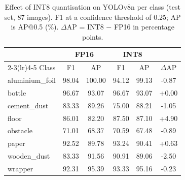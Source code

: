 \begin{table}[t]
\centering
\caption{Effect of INT8 quantisation on YOLOv8n per class (test set, 87 images). F1 at a confidence threshold of 0.25; AP is AP@0.5 (\%). $\Delta$AP = INT8 $-$ FP16 in percentage points.}
\label{tab:per_class_int8}
\footnotesize\setlength{\tabcolsep}{3pt}
\begin{tabular}{lccccc}
\toprule
 & \multicolumn{2}{c}{FP16} & \multicolumn{2}{c}{INT8} & \\
\cmidrule(lr){2-3}\cmidrule(lr){4-5}
Class & F1 & AP & F1 & AP & $\Delta$AP \\
\midrule
aluminium\_foil & 98.04 & 100.00 & 94.12 & 99.13 & -0.87 \\
bottle & 96.67 & 93.07 & 96.67 & 93.07 & +0.00 \\
cement\_dust & 83.33 & 89.26 & 75.00 & 88.21 & -1.05 \\
floor & 86.01 & 82.20 & 87.50 & 87.10 & +4.90 \\
obstacle & 71.01 & 68.37 & 70.59 & 67.48 & -0.89 \\
paper & 92.52 & 89.78 & 93.24 & 90.41 & +0.63 \\
wooden\_dust & 83.33 & 91.56 & 90.91 & 89.06 & -2.50 \\
wrapper & 92.31 & 95.39 & 93.33 & 95.16 & -0.23 \\
\bottomrule
\end{tabular}
\end{table}

